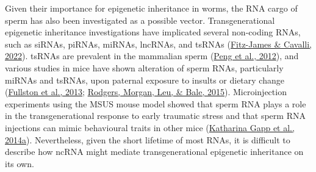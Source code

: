 \documentclass[12pt,twoside]{reedthesis}
\begin{document}
Given their importance for epigenetic inheritance in worms, the RNA
cargo of sperm has also been investigated as a possible vector.
Transgenerational epigenetic inheritance investigations have implicated
several non-coding RNAs, such as siRNAs, piRNAs, miRNAs, lncRNAs, and
tsRNAs (\protect\hyperlink{ref-fitz-james2022}{Fitz-James \& Cavalli, 2022}). tsRNAs are prevalent in the mammalian sperm
(\protect\hyperlink{ref-peng2012}{Peng et al., 2012}), and various studies in mice have shown alteration of sperm
RNAs, particularly miRNAs and tsRNAs, upon paternal exposure to insults
or dietary change (\protect\hyperlink{ref-fullston2013}{Fullston et al., 2013}; \protect\hyperlink{ref-rodgers2015}{Rodgers, Morgan, Leu, \& Bale, 2015}). Microinjection
experiments using the MSUS mouse model showed that sperm RNA plays a
role in the transgenerational response to early traumatic stress and
that sperm RNA injections can mimic behavioural traits in other mice
(\protect\hyperlink{ref-gapp2014}{Katharina Gapp et al., 2014a}). Nevertheless, given the short lifetime of most RNAs, it is
difficult to describe how ncRNA might mediate transgenerational
epigenetic inheritance on its own.
\end{document}
